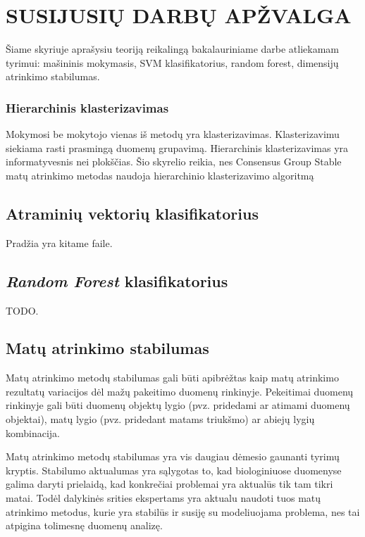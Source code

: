 \section{SUSIJUSIŲ DARBŲ APŽVALGA}
\label{darbu_apzvalga}

Šiame skyriuje aprašysiu teoriją reikalingą bakalauriniame darbe atliekamam tyrimui: mašininis mokymasis, SVM klasifikatorius, random forest, dimensijų atrinkimo stabilumas.



\subsubsection{Hierarchinis klasterizavimas}

Mokymosi be mokytojo vienas iš metodų yra klasterizavimas. Klasterizavimu siekiama rasti prasmingą duomenų grupavimą. 
Hierarchinis klasterizavimas yra informatyvesnis nei plokščias.
Šio skyrelio reikia, nes Consensus Group Stable matų atrinkimo metodas naudoja hierarchinio klasterizavimo algoritmą

\subsection{Atraminių vektorių klasifikatorius}

Pradžia yra kitame faile.

\subsection{\textit{Random Forest} klasifikatorius}

TODO.

\subsection{Matų atrinkimo stabilumas}

Matų atrinkimo metodų stabilumas gali būti apibrėžtas kaip matų atrinkimo rezultatų variacijos dėl mažų pakeitimo duomenų rinkinyje. Pekeitimai duomenų rinkinyje gali būti duomenų objektų lygio (pvz. pridedami ar atimami duomenų objektai), matų lygio (pvz. pridedant matams triukšmo) ar abiejų lygių kombinacija.

Matų atrinkimo metodų stabilumas yra vis daugiau dėmesio gaunanti tyrimų kryptis. Stabilumo aktualumas yra sąlygotas to, kad biologiniuose duomenyse galima daryti prielaidą, kad konkrečiai problemai yra aktualūs tik tam tikri matai. Todėl dalykinės srities ekspertams yra aktualu naudoti tuos matų atrinkimo metodus, kurie yra stabilūs ir susiję su modeliuojama problema, nes tai atpigina tolimesnę duomenų analizę. 

